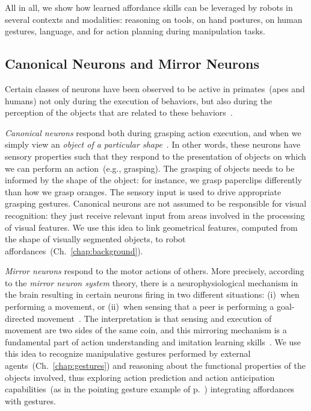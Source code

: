 All in all, we show how learned affordance skills can be leveraged by robots in several contexts and modalities: reasoning on tools, on hand postures, on human gestures, language, and for action planning during manipulation tasks.

\subsection{Canonical Neurons and Mirror Neurons}
\label{sec:motivation:neuro:canonical_and_mirror}

Certain classes of neurons have been observed to be active in primates~(apes and humans) not only during the execution of behaviors, but also during the perception of the objects that are related to these behaviors~\cite{rizzolatti:2004:arn}.

\emph{Canonical neurons} respond both during grasping action execution, and when we simply view an \emph{object of a particular shape}~\cite[Ch.~19]{kandel:2000:principles}.
In other words, these neurons have sensory properties such that they respond to the presentation of objects on which we can perform an action~(e.g., grasping).
The grasping of objects needs to be informed by the shape of the object: for instance, we grasp paperclips differently than how we grasp oranges.
The sensory input is used to drive appropriate grasping gestures.
Canonical neurons are not assumed to be responsible for visual recognition: they just receive relevant input from areas involved in the processing of visual features.
We use this idea to link geometrical features, computed from the shape of visually segmented objects, to robot affordances~(Ch.~\ref{chap:background}).

\emph{Mirror neurons} respond to the motor actions of others.
More precisely, according to the \emph{mirror neuron system} theory, there is a neurophysiological mechanism in the brain resulting in certain neurons firing in two different situations:
(i)~when performing a movement, or
(ii)~when sensing that a peer is performing a goal-directed movement~\cite{kilner:2009:jneurosci}.
The interpretation is that sensing and execution of movement are two sides of the same coin, and this mirroring mechanism is a fundamental part of action understanding and imitation learning skills~\cite{fogassi:2005:science,gazzola:2007:neuroimage}.
We use this idea to recognize manipulative gestures performed by external agents~(Ch.~\ref{chap:gestures})
and reasoning about the functional properties of the objects involved,
thus exploring action prediction and action anticipation capabilities~(as in the pointing gesture example of p.~\pageref{action_prediction})
integrating affordances with gestures.

